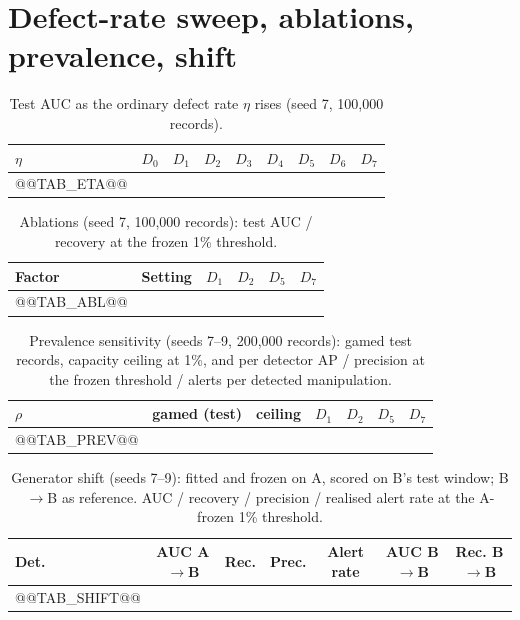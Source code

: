 \documentclass[conference]{IEEEtran}
\begin{document}
\section{Defect-rate sweep, ablations, prevalence, shift}
\begin{table}[t]\caption{Test AUC as the ordinary defect rate $\eta$ rises (seed 7, 100,000 records).}\centering\scriptsize
\begin{tabular}{@{}lcccccccc@{}}\toprule
$\eta$ & $D_0$ & $D_1$ & $D_2$ & $D_3$ & $D_4$ & $D_5$ & $D_6$ & $D_7$ \\\midrule
@@TAB_ETA@@
\bottomrule\end{tabular}\end{table}
\begin{table}[t]\caption{Ablations (seed 7, 100,000 records): test AUC / recovery at the frozen 1\% threshold.}\centering\scriptsize\setlength{\tabcolsep}{3pt}
\begin{tabular}{@{}llcccc@{}}\toprule
Factor & Setting & $D_1$ & $D_2$ & $D_5$ & $D_7$ \\\midrule
@@TAB_ABL@@
\bottomrule\end{tabular}\end{table}
\begin{table}[t]\caption{Prevalence sensitivity (seeds 7--9, 200,000 records): gamed test records, capacity ceiling at 1\%, and per detector AP / precision at the frozen threshold / alerts per detected manipulation.}\centering\scriptsize\setlength{\tabcolsep}{3pt}
\begin{tabular}{@{}lcccccc@{}}\toprule
$\rho$ & gamed (test) & ceiling & $D_1$ & $D_2$ & $D_5$ & $D_7$ \\\midrule
@@TAB_PREV@@
\bottomrule\end{tabular}\end{table}
\begin{table}[t]\caption{Generator shift (seeds 7--9): fitted and frozen on A, scored on B's test window; B$\rightarrow$B as reference. AUC / recovery / precision / realised alert rate at the A-frozen 1\% threshold.}\centering\scriptsize\setlength{\tabcolsep}{3pt}
\begin{tabular}{@{}lcccc|cc@{}}\toprule
Det. & AUC A$\rightarrow$B & Rec. & Prec. & Alert rate & AUC B$\rightarrow$B & Rec. B$\rightarrow$B \\\midrule
@@TAB_SHIFT@@
\bottomrule\end{tabular}\end{table}
\end{document}
